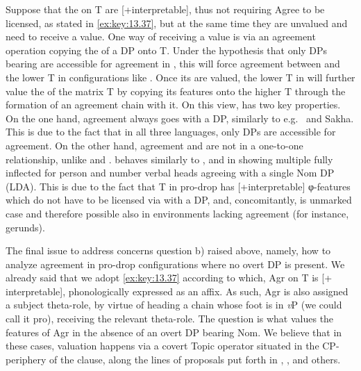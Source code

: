 \documentclass[output=paper]{langsci/langscibook}
\begin{document}
\begin{exe}
Suppose that the  on T are [+interpretable], thus not requiring
Agree to be licensed, as stated in \eqref{ex:key:13.37}, but at the same time
they are unvalued and need to receive a value. One way of receiving a value is
via an agreement operation copying the  of a DP onto T. Under the
hypothesis that only DPs bearing \Nom{} are accessible for agreement in ,
this will force agreement between \Nom{} and the lower T in configurations like
. Once its  are valued, the lower T in 
will further value the  of the matrix T by copying its features
onto the higher T through the formation of an agreement chain with it. On this
view,  has two key properties. On the one hand, agreement always goes with
a \Nom{} DP, similarly to e.g.\  and Sakha. This is due to the fact that in
all three languages, only \Nom{} DPs are accessible for agreement. On the other
hand, agreement and \Nom{} are not in a one-to-one relationship, unlike
 and .  behaves similarly to ,
and  in showing multiple fully inflected for person and number verbal heads
agreeing with a single Nom DP (\gls{LDA}). This is due to the
fact that T in pro-drop  has [+interpretable] φ-features which do
not have to be licensed via  with a \Nom{} DP, and, concomitantly,
\Nom{} is unmarked case and therefore possible also in environments lacking
agreement (for instance, gerunds).

The final issue to address concerns question b) raised above, namely, how to
analyze agreement in pro-drop configurations where no overt DP is present. We
already said that we adopt \eqref{ex:key:13.37} according to which, Agr on T is
[+ interpretable], phonologically expressed as an affix. As such, Agr is also
assigned a subject theta-role, by virtue of heading a chain whose foot is in
\emph{v}P (we could call it pro), receiving the relevant theta-role. The
question is what values the features of Agr in the absence of an overt DP
bearing Nom. We believe that in these cases, valuation happens via a covert
Topic operator situated in the CP-periphery of the clause, along the lines of
proposals put forth in \citet{Frascarelli2007}, \citet{FraHin2007},
\citet{Miyagawa2017} and others.


\end{exe}
\end{document}
